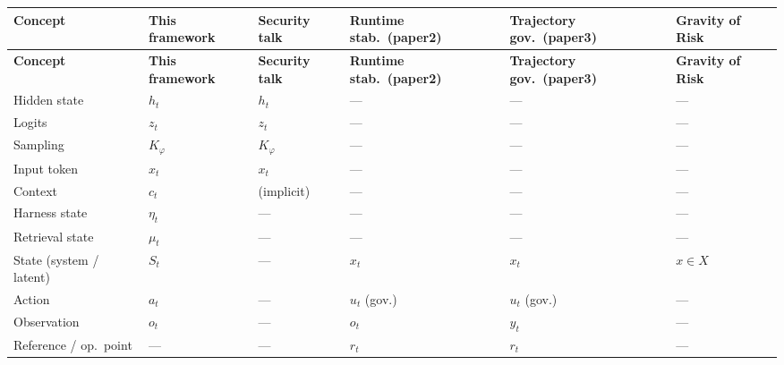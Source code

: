 \documentclass[11pt]{article}
\begin{document}
\renewcommand{\arraystretch}{1.2}
\begin{small}
\begin{longtable}{>{\raggedright\arraybackslash}p{3.4cm}>{\raggedright\arraybackslash}p{1.6cm}>{\raggedright\arraybackslash}p{1.6cm}>{\raggedright\arraybackslash}p{2.0cm}>{\raggedright\arraybackslash}p{2.0cm}>{\raggedright\arraybackslash}p{1.8cm}}
\toprule
\textbf{Concept} & \textbf{This framework} & \textbf{Security talk} & \textbf{Runtime stab.\ (paper2)} & \textbf{Trajectory gov.\ (paper3)} & \textbf{Gravity of Risk} \\
\midrule
\endfirsthead
\toprule
\textbf{Concept} & \textbf{This framework} & \textbf{Security talk} & \textbf{Runtime stab.\ (paper2)} & \textbf{Trajectory gov.\ (paper3)} & \textbf{Gravity of Risk} \\
\midrule
\endhead
Hidden state                  & $h_t$        & $h_t$        & ---                & ---                & ---             \\
Logits                        & $z_t$        & $z_t$        & ---                & ---                & ---             \\
Sampling                      & $K_\varphi$  & $K_\varphi$  & ---                & ---                & ---             \\
Input token                   & $x_t$        & $x_t$        & ---                & ---                & ---             \\
Context                       & $c_t$        & (implicit)   & ---                & ---                & ---             \\
Harness state                 & $\eta_t$     & ---          & ---                & ---                & ---             \\
Retrieval state               & $\mu_t$      & ---          & ---                & ---                & ---             \\
State (system / latent)       & $S_t$        & ---          & $x_t$              & $x_t$              & $x \in X$       \\
Action                        & $a_t$        & ---          & $u_t$ (gov.)       & $u_t$ (gov.)       & ---             \\
Observation                   & $o_t$        & ---          & $o_t$              & $y_t$              & ---             \\
Reference / op.\ point        & ---          & ---          & $r_t$              & $r_t$              & ---             \\

\end{longtable}
\end{small}
\end{document}
